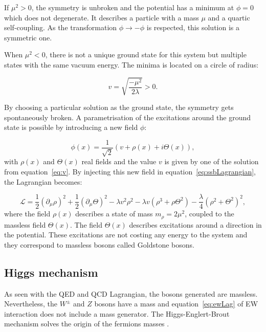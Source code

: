       If $\mu^{2} > 0$, the symmetry is unbroken and the potential has a minimum at $\phi = 0$ which does not degenerate.
      It describes a particle with a mass $\mu$ and a quartic self-coupling.
      As the transformation $\phi \rightarrow  - \phi$ is respected, this solution is a symmetric one.

      When $\mu^{2} < 0$, there is not a unique ground state for this system but multiple states with the same vacuum energy.
      The minima is located on a circle of radius:

      \begin{equation}
        v = \sqrt{\frac{- \mu^2}{2\lambda}} > 0.
        \label{eq:v}
      \end{equation}

      By choosing a particular solution as the ground state, the symmetry gets spontaneously broken.
      A parametrisation of the excitations around the ground state is possible by introducing a new field $\phi$:

      \begin{equation}
        \phi(x) = \frac{1}{\sqrt{2}} \left( v + \rho(x) + i\Theta(x) \right),
      \end{equation}
      with $\rho(x)$ and $\Theta(x)$ real fields and the value $v$ is given by one of the solution from equation~\ref{eq:v}.
      By injecting this new field in equation~\ref{eq:ssbLagrangian}, the Lagrangian becomes:

      \begin{equation}
        \mathcal{L} = \frac{1}{2} (\partial_{\mu}\rho)^2 + \frac{1}{2}(\partial_{\mu}\Theta)^2 - \lambda v^2 \rho^2 - \lambda v (\rho^3 +\rho \Theta^2) - \frac{\lambda}{4}(\rho^2 + \Theta^2)^2,
      \end{equation}
      where the field $\rho(x)$ describes a state of mass $m_{\rho} = 2 \mu^2$, coupled to the massless field $\Theta(x)$.
      The field $\Theta(x)$ describes excitations around a direction in the potential.
      These excitations are not costing any energy to the system and they correspond to massless bosons called Goldstone bosons.

      \subsection{Higgs mechanism}
      \label{sec:higgsMechanism}
      
      As seen with the \gls{QED} and \gls{QCD} Lagrangian, the bosons generated are massless.
      Nevertheless, the $W^{\pm}$ and $Z$ bosons have a mass and equation~\ref{eq:ewLag} of \gls{EW} interaction does not include a mass generator.
      The Higgs-Englert-Brout mechanism solves the origin of the fermions masses \cite{PhysRevLett.13.508}\cite{1964PhRvL..13..321E}.
       
